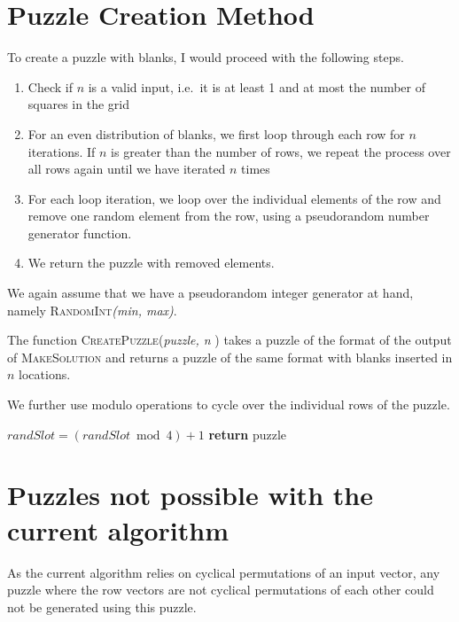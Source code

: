 \section{Puzzle Creation Method}
To create a puzzle with blanks, I would proceed with the following steps.

\begin{enumerate}
	\item Check if \( n \) is a valid input, i.e.\ it is at least 1 and at most the number of squares in the grid
	\item For an even distribution of blanks, we first loop through each row for \( n \) iterations. If \( n \) is greater than the number of rows, we repeat the process over all rows again until we have iterated \( n \) times
	\item For each loop iteration, we loop over the individual elements of the row and remove one random element from the row, using a pseudorandom number generator function.
	\item We return the puzzle with removed elements.
\end{enumerate}

We again assume that we have a pseudorandom integer generator at hand, namely \textsc{RandomInt}\emph{(min, max)}.

The function \textsc{CreatePuzzle}(\emph{puzzle, n} ) takes a puzzle of the format of the output of \textsc{MakeSolution} and returns a puzzle of the same format with blanks inserted in \( n \) locations.

We further use modulo operations to cycle over the individual rows of the puzzle.

\begin{algorithm}[H]
	\caption{}
	\begin{algorithmic}
		\EndIf{} 
		\State \( randSlot = (randSlot \bmod 4) + 1 \)
		\EndWhile 
		\EndFor{}
		\State \textbf{return} puzzle
		\EndFunction{}
	\end{algorithmic}
\end{algorithm}


\section{Puzzles not possible with the current algorithm}
As the current algorithm relies on cyclical permutations of an input vector, any puzzle where the row vectors are not cyclical permutations of each other could not be generated using this puzzle.

